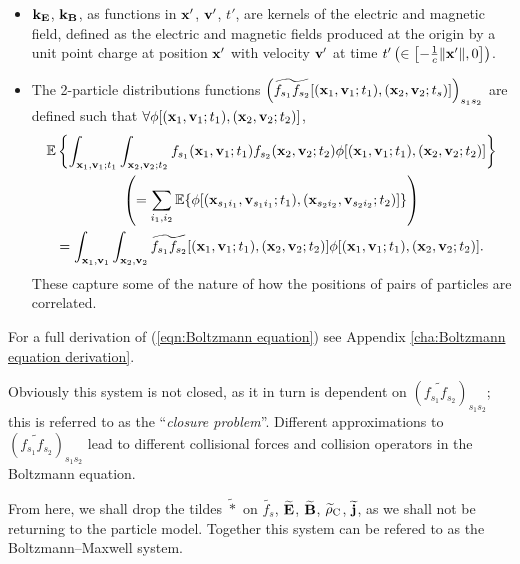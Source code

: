     \begin{itemize}
        \item  $\mathbf{k}_{\mathbf{E}}$, $\mathbf{k}_{\mathbf{B}}$, as functions in $\mathbf{x}'$, $\mathbf{v}'$, $t'$, are kernels of the electric and magnetic field, defined as the electric and magnetic fields produced at the origin by a unit point charge at position $\mathbf{x}'$ with velocity $\mathbf{v}'$ at time $t' \left(\in \left[-\frac{1}{c}\|\mathbf{x}'\|, 0\right]\right)$. 
        
        \item  The 2-particle distributions functions $\left(\widetilde{f_{s_{1}}f_{s_{2}}}[(\mathbf{x}_{1}, \mathbf{v}_{1}; t_{1}), (\mathbf{x}_{2}, \mathbf{v}_{2}; t_{s})]\right)_{s_{1}s_{2}}$ are defined such that $\forall \phi[(\mathbf{x}_{1}, \mathbf{v}_{1}; t_{1}), (\mathbf{x}_{2}, \mathbf{v}_{2}; t_{2})]$,
        \begin{multline}
            \mathbb{E}\left\{\int_{\mathbf{x}_{1}, \mathbf{v}_{1}; t_{1}}\int_{\mathbf{x}_{2}, \mathbf{v}_{2}; t_{2}}f_{s_{1}}(\mathbf{x}_{1}, \mathbf{v}_{1}; t_{1})f_{s_{2}}(\mathbf{x}_{2}, \mathbf{v}_{2}; t_{2})\phi[(\mathbf{x}_{1}, \mathbf{v}_{1}; t_{1}), (\mathbf{x}_{2}, \mathbf{v}_{2}; t_{2})]\right\}  \\
            \left(=  \sum_{i_{1}, i_{2}}\mathbb{E}\{\phi[(\mathbf{x}_{s_{1}i_{1}}, \mathbf{v}_{s_{1}i_{1}}; t_{1}), (\mathbf{x}_{s_{2}i_{2}}, \mathbf{v}_{s_{2}i_{2}}; t_{2})]\}\right)  \\
            =  \int_{\mathbf{x}_{1}, \mathbf{v}_{1}}\int_{\mathbf{x}_{2}, \mathbf{v}_{2}}\widetilde{f_{s_{1}}f_{s_{2}}}[(\mathbf{x}_{1}, \mathbf{v}_{1}; t_{1}), (\mathbf{x}_{2}, \mathbf{v}_{2}; t_{2})]\phi[(\mathbf{x}_{1}, \mathbf{v}_{1}; t_{1}), (\mathbf{x}_{2}, \mathbf{v}_{2}; t_{2})].
        \end{multline}
        These capture some of the nature of how the positions of pairs of particles are correlated.
    \end{itemize}
    For a full derivation of (\ref{eqn:Boltzmann equation}) see Appendix \ref{cha:Boltzmann equation derivation}.

    Obviously this system is not closed, as it in turn is dependent on $\left(\widetilde{f_{s_{1}}f_{s_{2}}}\right)_{s_{1}s_{2}}$; this is referred to as the ``\emph{closure problem}''. Different approximations to $\left(\widetilde{f_{s_{1}}f_{s_{2}}}\right)_{s_{1}s_{2}}$ lead to different collisional forces and collision operators in the Boltzmann equation.

    \shortline

    From here, we shall drop the tildes $\widetilde{*}$ on $\widetilde{f_{s}}$, $\widetilde{\mathbf{E}}$, $\widetilde{\mathbf{B}}$, $\widetilde{\rho}_{\mathrm{C}}$, $\widetilde{\mathbf{j}}$, as we shall not be returning to the particle model. Together this system can be refered to as the Boltzmann--Maxwell system.


    
    